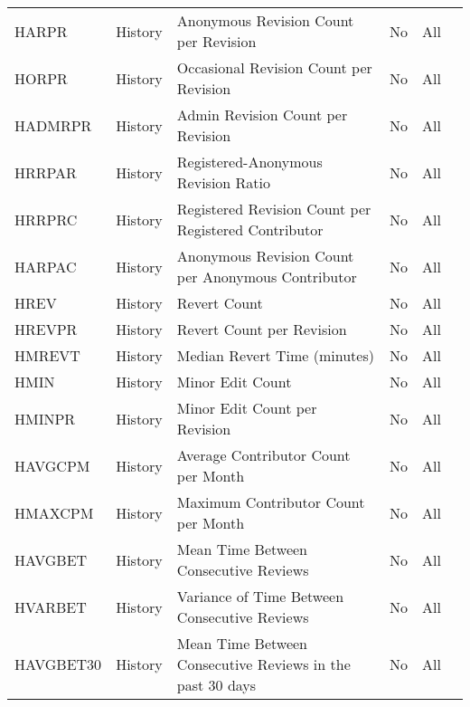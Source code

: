 \begin{longtable}{l l m{} c c m{}}
    HARPR & History & Anonymous Revision Count per Revision & No & All & \cite{Bassani2019_lr359, Wohner2015_lr2022} \\
    HORPR & History & Occasional Revision Count per Revision  & No & All & \cite{Dalip2009_lr14, Anderka2012_lr17, Wang2020_lr26, Wang2019_lr74, Hou2021_lr122, Bassani2019_lr359, Dalip2016_lr1002, Dalip2011_lr1003} \\
    HADMRPR & History & Admin Revision Count per Revision & No & All & \cite{Couto2021_lr161, Stvilia2007_lr1012, Stvilia2005_lr1013} \\
    HRRPAR & History & Registered-Anonymous Revision Ratio & No & All & \cite{Bassani2019_lr359} \\
    HRRPRC & History & Registered Revision Count per Registered Contributor & No & All & \cite{Calzada2010_lr8} \\
    HARPAC & History & Anonymous Revision Count per Anonymous Contributor & No & All & \cite{Calzada2010_lr8} \\
    HREV & History & Revert Count & No & All & \cite{Anderka2012_lr17, Fahimnia2022_lr118, Couto2021_lr161, Bassani2019_lr359, Stvilia2007_lr1012, Stvilia2005_lr1013, Sugandhika2021_lr1041} \\
    HREVPR & History & Revert Count per Revision & No & All & \cite{Calzada2010_lr8, Dondio2007_lr59, Wu2010_lr61, Bassani2019_lr359} \\
    HMREVT & History & Median Revert Time (minutes) & No & All & \cite{Warncke-Wang2013_lr13, Anderka2012_lr17, Fahimnia2022_lr118, Couto2021_lr161, Stvilia2007_lr1012, Stvilia2005_lr1013} \\
    HMIN & History & Minor Edit Count & No & All & \cite{Sugandhika2021_lr1041} \\
    HMINPR & History & Minor Edit Count per Revision & No & All & \cite{Wu2010_lr61, Marzini2014_lr2010} \\
    HAVGCPM & History & Average Contributor Count per Month & No & All & \cite{Wang2010_lr70} \\
    HMAXCPM & History & Maximum Contributor Count per Month & No & All & \cite{Wang2010_lr70} \\
    HAVGBET & History & Mean Time Between Consecutive Reviews & No & All & \cite{Das2021_lr97, Yahya2014_lr148, Robertie2017_lr172} \\
    HVARBET & History & Variance of Time Between Consecutive Reviews & No & All & \cite{Das2021_lr97, Robertie2017_lr172} \\
    HAVGBET30 & History & Mean Time Between Consecutive Reviews in the past 30 days & No & All & \cite{Wang2020_lr26, Wang2019_lr74, Hou2021_lr122} \\

\end{longtable}
